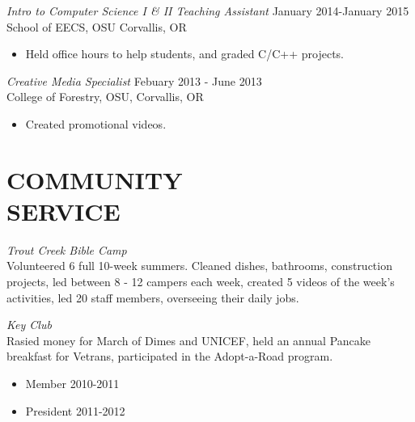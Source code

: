 \documentclass[line,margin]{res}
\begin{document}
\begin{resume}
                    {\sl Intro to Computer Science I \& II Teaching Assistant} \hfill January 2014-January 2015\\
                    School of EECS, OSU
                    Corvallis, OR
                    \begin{itemize}  \itemsep -2pt %
                        \item Held office hours to help students, and graded C/C++ projects.
                    \end{itemize}
                    
                    {\sl Creative Media Specialist} \hfill Febuary 2013 - June 2013 \\
                    College of Forestry, OSU,
                    Corvallis, OR
                    \begin{itemize}
                       \item Created promotional videos.
                    \end{itemize} 
 
\section{COMMUNITY \\ SERVICE}  
                {\sl Trout Creek Bible Camp\\}
                    Volunteered 6 full 10-week summers.
                    Cleaned dishes, bathrooms, construction projects,
                    led between 8 - 12 campers each week,
                    created 5 videos of the week's activities,
                    led 20 staff members, overseeing their daily jobs.

                {\sl Key Club\\}
                    Rasied money for March of Dimes and UNICEF, held an annual Pancake breakfast
                    for Vetrans, participated in the Adopt-a-Road program.
                    \begin{itemize}  \itemsep -2pt %
                        \item Member 2010-2011
                        \item President 2011-2012
                    \end{itemize}


\end{resume}
\end{document}
